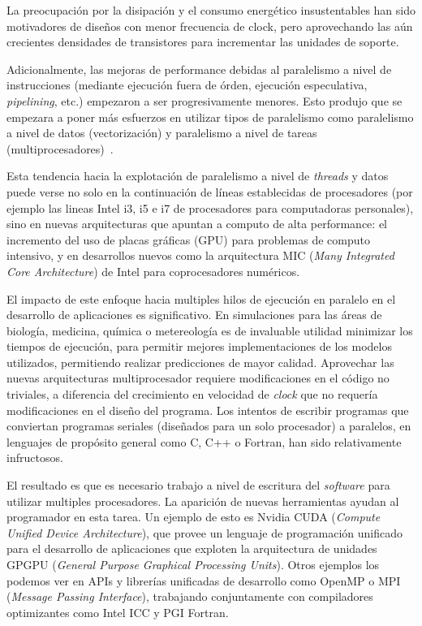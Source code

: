 La preocupaci\'on por la disipaci\'on y el consumo energ\'etico insustentables han sido motivadores de dise\~nos con menor frecuencia
de clock, pero aprovechando las a\'un crecientes densidades de transistores para incrementar las unidades de soporte.

Adicionalmente, las mejoras de performance debidas al paralelismo
a nivel de instrucciones (mediante ejecuci\'on fuera de \'orden,
ejecuci\'on especulativa, \textit{pipelining}, etc.) empezaron a ser
progresivamente menores. Esto produjo que se empezara a poner m\'as esfuerzos en
utilizar tipos de paralelismo como paralelismo a nivel de datos (vectorizaci\'on)
y paralelismo a nivel de tareas (multiprocesadores)~\cite{HennessyPatterson}.

Esta tendencia hacia la explotaci\'on de paralelismo a nivel de \textit{threads} y datos
puede verse no solo en la continuaci\'on de l\'ineas establecidas
de procesadores (por ejemplo las lineas Intel i3, i5 e i7 de procesadores para computadoras
personales), sino en nuevas arquitecturas que apuntan a computo de alta performance: el incremento
del uso de placas gr\'aficas (GPU) para problemas de computo intensivo, y en desarrollos
nuevos como la arquitectura MIC (\textit{Many Integrated Core Architecture}) de
Intel para coprocesadores num\'ericos.

El impacto de este enfoque hacia multiples hilos de ejecuci\'on en paralelo en el
desarrollo de aplicaciones es significativo. En simulaciones para las \'areas de biolog\'ia,
medicina, qu\'imica o metereolog\'ia es de invaluable utilidad minimizar los tiempos
de ejecuci\'on, para permitir mejores implementaciones de los modelos utilizados,
permitiendo realizar predicciones de mayor calidad. Aprovechar las nuevas
arquitecturas multiprocesador requiere modificaciones en el c\'odigo no triviales,
a diferencia del crecimiento en velocidad de \textit{clock} que no requer\'ia modificaciones
en el dise\~no del programa. Los intentos de escribir programas que conviertan
programas seriales (dise\~nados para un solo procesador) a paralelos, en lenguajes
de prop\'osito general como C, C++ o Fortran, han sido relativamente infructosos.

El resultado es que es necesario trabajo a nivel de escritura del \textit{software}
para utilizar multiples procesadores. La aparici\'on de nuevas herramientas ayudan
al programador en esta tarea. Un ejemplo de esto es Nvidia CUDA (\textit{Compute
Unified Device Architecture}), que provee un lenguaje de programaci\'on unificado
para el desarrollo de aplicaciones que exploten la arquitectura de unidades GPGPU
(\textit{General Purpose Graphical Processing Units}). Otros ejemplos los podemos
ver en APIs y librer\'ias unificadas de desarrollo como OpenMP o MPI
(\textit{Message Passing Interface}), trabajando conjuntamente con compiladores
optimizantes como Intel ICC y PGI Fortran.

